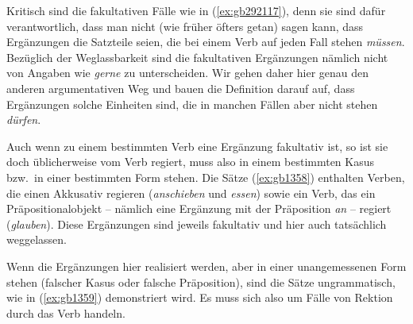\begin{exe}
  \ex\label{ex:gb292116}
  \begin{xlist}
  \end{xlist}
  \ex\label{ex:gb292117}
  \begin{xlist}
  \end{xlist}
  \ex\label{ex:gb292118}
  \begin{xlist}
  \end{xlist}
\end{exe}

Kritisch sind die fakultativen Fälle wie in (\ref{ex:gb292117}), denn sie sind dafür verantwortlich, dass man nicht (wie früher öfters getan) sagen kann, dass Ergänzungen die Satzteile seien, die bei einem Verb auf jeden Fall stehen \textit{müssen}.
Bezüglich der Weglassbarkeit sind die fakultativen Ergänzungen nämlich nicht von Angaben wie \textit{gerne} zu unterscheiden.
Wir gehen daher hier genau den anderen argumentativen Weg und bauen die Definition darauf auf, dass Ergänzungen solche Einheiten sind, die in manchen Fällen aber nicht stehen \textit{dürfen}.

Auch wenn zu einem bestimmten Verb eine Ergänzung fakultativ ist, so ist sie doch üblicherweise vom Verb regiert, muss also in einem bestimmten Kasus bzw.\ in einer bestimmten Form stehen.
Die Sätze (\ref{ex:gb1358}) enthalten Verben, die einen Akkusativ regieren (\textit{anschieben} und \textit{essen}) sowie ein Verb, das ein Präpositionalobjekt -- nämlich eine Ergänzung mit der Präposition \textit{an} -- regiert (\textit{glauben}).
Diese Ergänzungen sind jeweils fakultativ und hier auch tatsächlich weggelassen.

\begin{exe}
  \ex\label{ex:gb1358}
  \begin{xlist}
  \end{xlist}
\end{exe}

Wenn die Ergänzungen hier realisiert werden, aber in einer unangemessenen Form stehen (falscher Kasus oder falsche Präposition), sind die Sätze ungrammatisch, wie in (\ref{ex:gb1359}) demonstriert wird.
Es muss sich also um Fälle von Rektion durch das Verb handeln.

